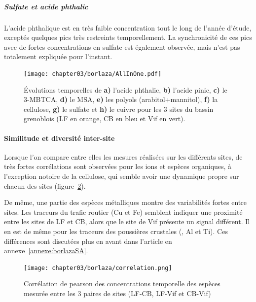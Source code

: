 \subparagraph{Sulfate et acide phthalic}%
\label{par:sulfate_et_acide_phthalic}

L'acide phthalique est en très faible concentration tout le long de l'année d'étude,
exceptés quelques pics très restreints temporellement. La synchronicité de ces pics avec
de fortes concentrations en sulfate est également observée, mais n'est pas totalement
expliquée pour l'instant.


\begin{figure}[ht]
    \centering
    \texttt{[image: chapter03/borlaza/AllInOne.pdf]}
    \caption{
        Évolutions temporelles de \textbf{a)} l'acide phthalic, \textbf{b)} l'acide
        pinic, \textbf{c)} le 3-MBTCA, \textbf{d)} le MSA, \textbf{e)} les polyols
        (arabitol+mannitol), \textbf{f)} la cellulose, \textbf{g)} le sulfate et
        \textbf{h)} le cuivre pour les 3 sites du bassin grenoblois (LF en orange, CB en
        bleu et Vif en vert).
    }%
    \label{fig:borlaza_evolution_temporelle}
\end{figure}

\paragraph{Similitude et diversité inter-site}%
\label{par:similitude_et_diversité_inter_site}

Lorsque l'on compare entre elles les mesures réalisées sur les différents sites, de très
fortes corrélations sont observées pour les ions et espèces organiques, à l'exception
notoire de la cellulose, qui semble avoir une dynamique propre sur chacun des sites
(figure~\ref{fig:chapter03/borlaza/correlation}).

De même, une partie des espèces métalliques montre des variabilités fortes entre sites.
Les traceurs du trafic routier (Cu et Fe) semblent indiquer une proximité entre les sites
de LF et CB, alors que le site de Vif présente un signal différent. Il en est de même
pour les traceurs des poussières crustales (, Al et Ti). Ces différences sont
discutées plus en avant dans l'article en annexe~\ref{annexe:borlazaSA}.

\begin{figure}[ht]
    \centering
    \texttt{[image: chapter03/borlaza/correlation.png]}
    \caption{Corrélation de pearson des concentrations temporelle des espèces mesurée
    entre les 3 paires de sites (LF-CB, LF-Vif et CB-Vif)}%
    \label{fig:chapter03/borlaza/correlation}
\end{figure}

